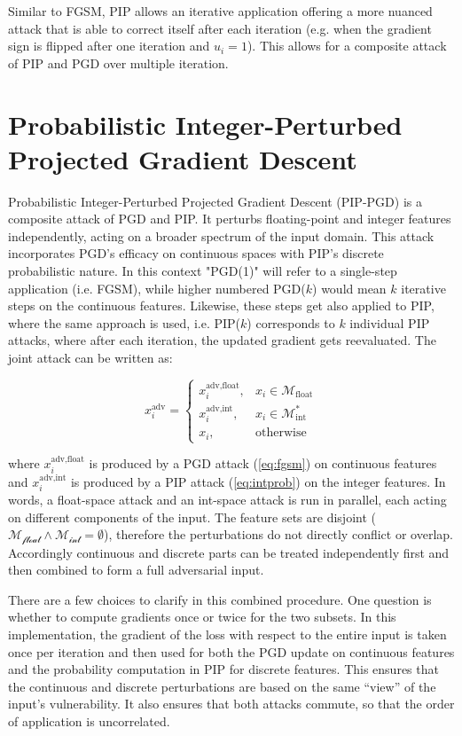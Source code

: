 Similar to FGSM, PIP allows an iterative application offering a more nuanced attack that is able to correct itself after each iteration (e.g. when the gradient sign is flipped after one iteration and $u_i=1$). This allows for a composite attack of PIP and PGD over multiple iteration. 

\section{Probabilistic Integer-Perturbed Projected Gradient Descent}
\label{sec:method_combined}

Probabilistic Integer-Perturbed Projected Gradient Descent (PIP-PGD) is a composite attack of PGD and PIP. It perturbs floating-point and integer features independently, acting on a broader spectrum of the input domain. This attack incorporates PGD's efficacy on continuous spaces with PIP's discrete probabilistic nature. In this context "PGD(1)" will refer to a single-step application (i.e. FGSM), while higher numbered PGD($k$) would mean $k$ iterative steps on the continuous features. Likewise, these steps get also applied to PIP, where the same approach is used, i.e. PIP($k$) corresponds to $k$ individual PIP attacks, where after each iteration, the updated gradient gets reevaluated. The joint attack can be written as:

\begin{equation}
x_i^{\text{adv}} = 
    \begin{cases} 
    x^{\text{adv,float}}_i, & x_i\in\mathcal{M}_{\text{float}} \\[4pt]
    x^{\text{adv,int}}_i,   & x_i\in\mathcal{M}_{\text{int}}^*   \\[4pt]
    x_i, & \text{otherwise}
    \end{cases}
\label{eq:joint_attack}
\end{equation}

where $x^{\text{adv,float}}_i$ is produced by a PGD attack (\ref{eq:fgsm}) on continuous features and $x^{\text{adv,int}}_i$ is produced by a PIP attack (\ref{eq:intprob}) on the integer features. In words, a float-space attack and an int-space attack is run in parallel, each acting on different components of the input. The feature sets are disjoint ($\mathcal{M_{\text{float}}} \wedge \mathcal{M_{\text{int}}}=\emptyset$), therefore the perturbations do not directly conflict or overlap. Accordingly continuous and discrete parts can be treated independently first and then combined to form a full adversarial input.

There are a few choices to clarify in this combined procedure. One question is whether to compute gradients once or twice for the two subsets. In this implementation, the gradient of the loss with respect to the entire input is taken once per iteration and then used for both the PGD update on continuous features and the probability computation in PIP for discrete features. This ensures that the continuous and discrete perturbations are based on the same “view” of the input’s vulnerability. It also ensures that both attacks commute, so that the order of application is uncorrelated.